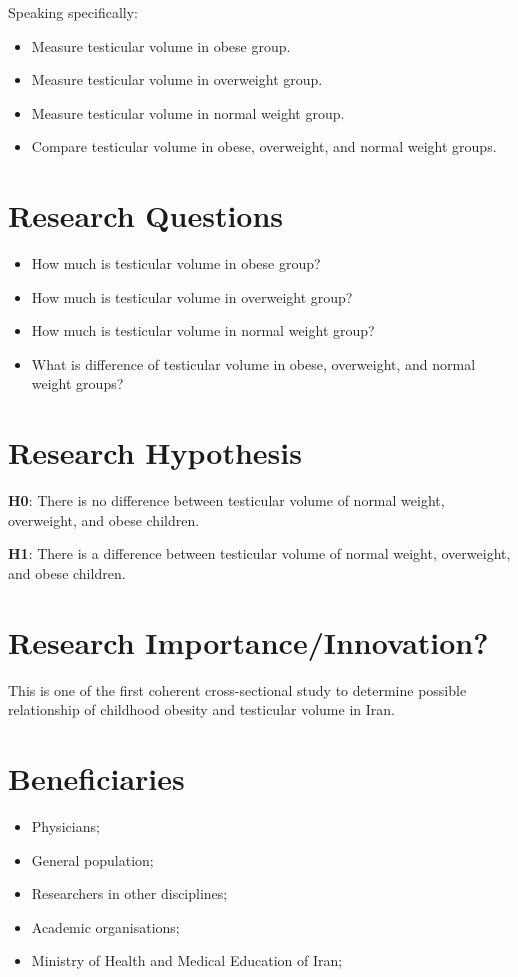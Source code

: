 \documentclass[11pt]{article}
\begin{document}
\noindent
Speaking specifically:
\begin{itemize}
\item Measure testicular volume in obese group.
\item Measure testicular volume in overweight group.
\item Measure testicular volume in normal weight group.
\item Compare testicular volume in obese, overweight, and normal weight groups.
\end{itemize}

\section{Research Questions}
\label{sec:orgf908f16}
\begin{itemize}
\item How much is testicular volume in obese group?
\item How much is testicular volume in overweight group?
\item How much is testicular volume in normal weight group?
\item What is difference of testicular volume in obese, overweight, and normal weight groups?
\end{itemize}

\section{Research Hypothesis}
\label{sec:org831c898}
\textbf{H0}: There is no difference between testicular volume of normal weight, overweight, and obese children.

\noindent
\textbf{H1}: There is a difference between testicular volume of normal weight, overweight, and obese children.

\section{Research Importance/Innovation?}
\label{sec:orgedd3502}
This is one of the first coherent cross-sectional study to determine possible relationship of childhood obesity and testicular volume in Iran.

\section{Beneficiaries}
\label{sec:org0f84feb}
\begin{itemize}
\item Physicians;
\item General population;
\item Researchers in other disciplines;
\item Academic organisations;
\item Ministry of Health and Medical Education of Iran;
\end{itemize}
\end{document}
